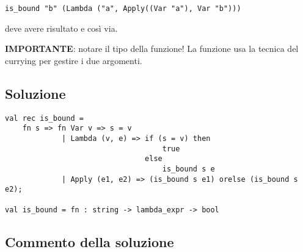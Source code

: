 \begin{lstlisting}
is_bound "b" (Lambda ("a", Apply((Var "a"), Var "b")))
\end{lstlisting}

deve avere risultato  e così via.

\medskip
\textbf{IMPORTANTE}: notare il tipo della funzione! La funzione usa la tecnica del currying per gestire i due argomenti.

\subsection*{Soluzione}

\begin{lstlisting}[style = SML, caption = {Definizione della funzione \sml{is_bound}}]
val rec is_bound =
	fn s => fn Var v => s = v
			 | Lambda (v, e) => if (s = v) then
									true
								else
									is_bound s e
			 | Apply (e1, e2) => (is_bound s e1) orelse (is_bound s e2);

val is_bound = fn : string -> lambda_expr -> bool
\end{lstlisting}

\subsection{Commento della soluzione}

\omissis

